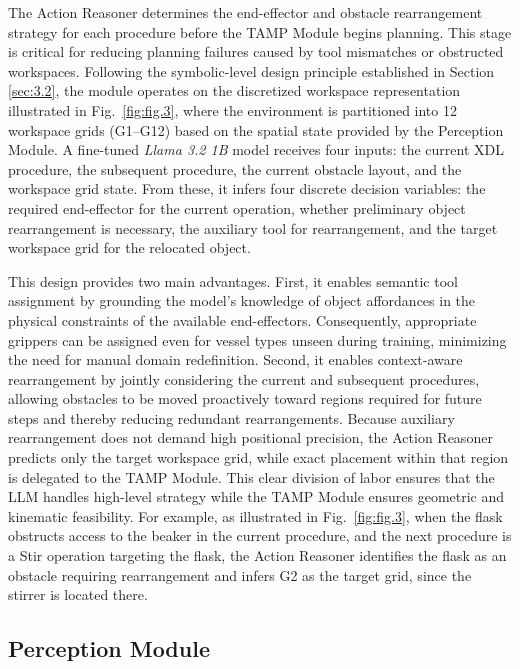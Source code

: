 \documentclass{ieeeaccess}
\begin{document}
The Action Reasoner determines the end-effector and obstacle rearrangement strategy for each procedure before the TAMP Module begins planning. This stage is critical for reducing planning failures caused by tool mismatches or obstructed workspaces. Following the symbolic-level design principle established in Section \ref{sec:3.2}, the module operates on the discretized workspace representation illustrated in Fig.~\ref{fig:fig.3}, where the environment is partitioned into 12 workspace grids (G1--G12) based on the spatial state provided by the Perception Module. A fine-tuned \textit{Llama 3.2 1B} model receives four inputs: the current XDL procedure, the subsequent procedure, the current obstacle layout, and the workspace grid state. From these, it infers four discrete decision variables: the required end-effector for the current operation, whether preliminary object rearrangement is necessary, the auxiliary tool for rearrangement, and the target workspace grid for the relocated object.

This design provides two main advantages. First, it enables semantic tool assignment by grounding the model's knowledge of object affordances in the physical constraints of the available end-effectors. Consequently, appropriate grippers can be assigned even for vessel types unseen during training, minimizing the need for manual domain redefinition. Second, it enables context-aware rearrangement by jointly considering the current and subsequent procedures, allowing obstacles to be moved proactively toward regions required for future steps and thereby reducing redundant rearrangements. Because auxiliary rearrangement does not demand high positional precision, the Action Reasoner predicts only the target workspace grid, while exact placement within that region is delegated to the TAMP Module. This clear division of labor ensures that the LLM handles high-level strategy while the TAMP Module ensures geometric and kinematic feasibility. For example, as illustrated in Fig.~\ref{fig:fig.3}, when the flask obstructs access to the beaker in the current procedure, and the next procedure is a Stir operation targeting the flask, the Action Reasoner identifies the flask as an obstacle requiring rearrangement and infers G2 as the target grid, since the stirrer is located there.



\subsection{Perception Module}\label{sec:3.3}
\end{document}
